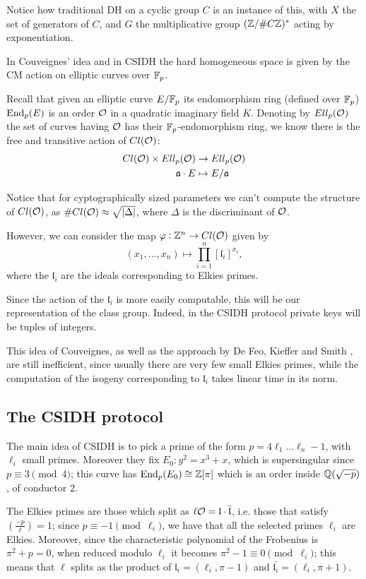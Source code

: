 Notice how traditional DH on a cyclic group $C$ is an instance of this, with $X$ the set of generators of $C$, and $G$ the multiplicative group $(\mathbb{Z}/\# C\mathbb{Z})^\ast$ acting by exponentiation.

In Couveignes' idea and in CSIDH the hard homogeneous space is given by the CM action on elliptic curves over $\mathbb{F}_p$.

Recall that given an elliptic curve $E/\mathbb{F}_p$ its endomorphism ring (defined over $\mathbb{F}_p$) $\operatorname{End}_p(E)$ is an order $\mathcal{O}$ in a quadratic imaginary field $K$. Denoting by $Ell_p(\mathcal{O})$ the set of curves having $\mathcal{O}$ has their $\mathbb{F}_p$-endomorphism ring, we know there is the free and transitive action of $Cl(\mathcal{O})$:
\begin{align*}
    Cl(\mathcal{O})\times Ell_p(\mathcal{O}) & \to  Ell_p(\mathcal{O})\\
    \mathfrak{a}\cdot E & \mapsto  E/\mathfrak{a}
\end{align*}

Notice that for cyptographically sized parameters we can't compute the structure of $Cl(\mathcal{O})$, as $\# Cl(\mathcal{O})\approx \sqrt{|\Delta|}$, where $\Delta$ is the discriminant of $\mathcal{O}$.

However, we can consider the map $\varphi:\mathbb{Z}^n\to Cl(\mathcal{O})$ given by
$$(x_1,\dots,x_n)\mapsto \prod_{i=1}^n[\mathfrak{l}_i]^{x_i},$$
where the $\mathfrak{l}_i$ are the ideals corresponding to Elkies primes.

Since the action of the $\mathfrak{l}_i$ is more easily computable, this will be our representation of the class group. Indeed, in the CSIDH protocol private keys will be tuples of integers.

This idea of Couveignes, as well as the approach by De Feo, Kieffer and Smith \cite{DeFeo_CSIDH}, are still inefficient, since usually there are very few small Elkies primes, while the computation of the isogeny corresponding to $\mathfrak{l}_i$ takes linear time in its norm.

\subsection{The CSIDH protocol}
The main idea of CSIDH is to pick a prime of the form $p=4\ell_1\dots\ell_n-1$, with $\ell_i$ small primes. Moreover they fix $E_0: y^2=x^3+x$, which is supersingular since $p\equiv3\pmod 4$; this curve has $\operatorname{End}_p(E_0)\cong\mathbb{Z}[\pi]$ which is an order inside $\mathbb{Q}(\sqrt{-p})$, of conductor $2$.

The Elkies primes are those which split as $\ell\mathcal{O}=\mathfrak{l}\cdot\bar{\mathfrak{l}}$, i.e. those that satisfy $\left( \frac{-p}{\ell} \right)=1$; since $p\equiv-1\pmod{\ell_i}$, we have that all the selected primes $\ell_i$ are Elkies. Moreover, since the characteristic polynomial of the Frobenius is $\pi^2+p=0$, when reduced modulo $\ell_i$ it becomes $\pi^2-1\equiv0\pmod{\ell_i}$; this means that $\ell$ splits as the product of $\mathfrak{l}_i=(\ell_i, \pi-1)$ and $\bar{\mathfrak{l}_i}=(\ell_i, \pi+1)$.

